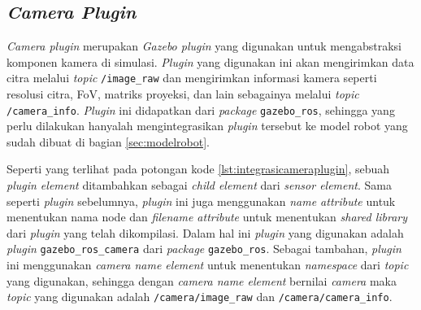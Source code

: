 \subsection{\emph{Camera Plugin}}
\label{subsec:cameraplugin}

\emph{Camera plugin} merupakan \emph{Gazebo plugin} yang digunakan untuk mengabstraksi komponen kamera di simulasi.
\emph{Plugin} yang digunakan ini akan mengirimkan data citra melalui \emph{topic} \lstinline{/image_raw} dan mengirimkan informasi kamera seperti resolusi citra, FoV, matriks proyeksi, dan lain sebagainya melalui \emph{topic} \lstinline{/camera_info}.
\emph{Plugin} ini didapatkan dari \emph{package} \lstinline{gazebo_ros},
  sehingga yang perlu dilakukan hanyalah mengintegrasikan \emph{plugin} tersebut ke model robot yang sudah dibuat di bagian \ref{sec:modelrobot}.



Seperti yang terlihat pada potongan kode \ref{lst:integrasicameraplugin},
  sebuah \emph{plugin element} ditambahkan sebagai \emph{child element} dari \emph{sensor element}.
Sama seperti \emph{plugin} sebelumnya, \emph{plugin} ini juga menggunakan \emph{name attribute} untuk menentukan nama node dan \emph{filename attribute} untuk menentukan \emph{shared library} dari \emph{plugin} yang telah dikompilasi.
Dalam hal ini \emph{plugin} yang digunakan adalah \emph{plugin} \lstinline{gazebo_ros_camera} dari \emph{package} \lstinline{gazebo_ros}.
Sebagai tambahan, \emph{plugin} ini menggunakan \emph{camera name element} untuk menentukan \emph{namespace} dari \emph{topic} yang digunakan,
  sehingga dengan \emph{camera name element} bernilai \emph{camera} maka \emph{topic} yang digunakan adalah \lstinline{/camera/image_raw} dan \lstinline{/camera/camera_info}.
